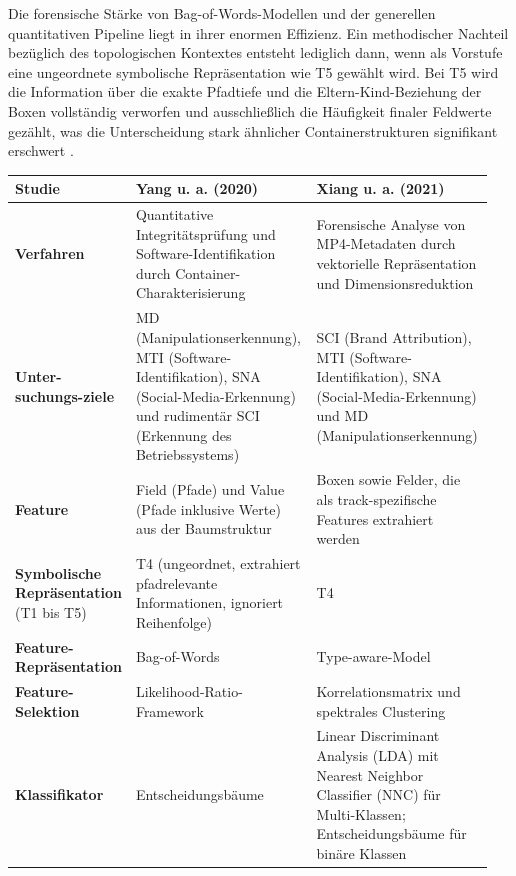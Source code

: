 Die forensische Stärke von Bag-of-Words-Modellen und der generellen quantitativen Pipeline liegt in ihrer enormen Effizienz. Ein methodischer Nachteil bezüglich des topologischen Kontextes entsteht lediglich dann, wenn als Vorstufe eine ungeordnete symbolische Repräsentation wie T5 gewählt wird. Bei T5 wird die Information über die exakte Pfadtiefe und die Eltern-Kind-Beziehung der Boxen vollständig verworfen und ausschließlich die Häufigkeit finaler Feldwerte gezählt, was die Unterscheidung stark ähnlicher Containerstrukturen signifikant erschwert \cite{yang_comprehensive_2025}.


\begin{table}[H]
    \centering
    \begin{tabular}{>{\raggedright\arraybackslash}p{0.15\linewidth}>{\raggedright\arraybackslash}p{0.4\linewidth}>{\raggedright\arraybackslash}p{0.4\linewidth}}\toprule
 \textbf{Studie}& Yang u. a. (2020) \cite{yang_efficient_2020}&	
Xiang u. a. (2021) \cite{xiang_forensic_2021}\\\midrule
         \textbf{Verfahren}&  Quantitative Integritätsprüfung und Software-Identifikation durch Container-Charakterisierung&Forensische Analyse von MP4-Metadaten durch vektorielle Repräsentation und Dimensionsreduktion\\\midrule
         \textbf{Unter-suchungs-ziele}&  MD (Manipulationserkennung), MTI (Software-Identifikation), SNA (Social-Media-Erkennung) und rudimentär SCI (Erkennung des Betriebssystems)&SCI (Brand Attribution), MTI (Software-Identifikation), SNA (Social-Media-Erkennung) und MD (Manipulationserkennung)\\\midrule
         \textbf{Feature}&  Field (Pfade) und Value (Pfade inklusive Werte) aus der Baumstruktur&Boxen sowie Felder, die als track-spezifische Features extrahiert werden\\\midrule
         \textbf{Symbolische Repräsentation} (T1 bis T5)&  T4 (ungeordnet, extrahiert pfadrelevante Informationen, ignoriert Reihenfolge)&T4\\\midrule
         \textbf{Feature-Repräsentation}&  Bag-of-Words&Type-aware-Model\\\midrule
         \textbf{Feature-Selektion}&  	
Likelihood-Ratio-Framework &Korrelationsmatrix und spektrales Clustering \\\midrule
         \textbf{Klassifikator}&  Entscheidungsbäume &Linear Discriminant Analysis (LDA) mit Nearest Neighbor Classifier (NNC) für Multi-Klassen; Entscheidungsbäume für binäre Klassen\\\midrule

\end{tabular}
\end{table}
